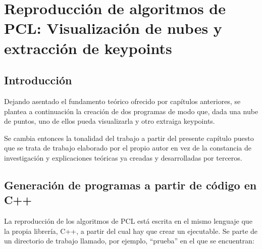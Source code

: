 \chapter{Reproducción de algoritmos de PCL: Visualización de nubes y extracción de keypoints}

\section{Introducción}
Dejando asentado el fundamento teórico ofrecido por capítulos anteriores, se plantea a continuación la creación de dos programas de modo que, dada una nube de puntos, uno de ellos pueda visualizarla y otro extraiga keypoints.

Se cambia entonces la tonalidad del trabajo a partir del presente capítulo puesto que se trata de trabajo elaborado por el propio autor en vez de la constancia de investigación y explicaciones teóricas ya creadas y desarrolladas por terceros.

\section{Generación de programas a partir de código en C++}
La reproducción de los algoritmos de PCL está escrita en el mismo lenguaje que la propia librería, C++, a partir del cual hay que crear un ejecutable. Se parte de un directorio de trabajo llamado, por ejemplo, ``prueba'' en el que se encuentran:


